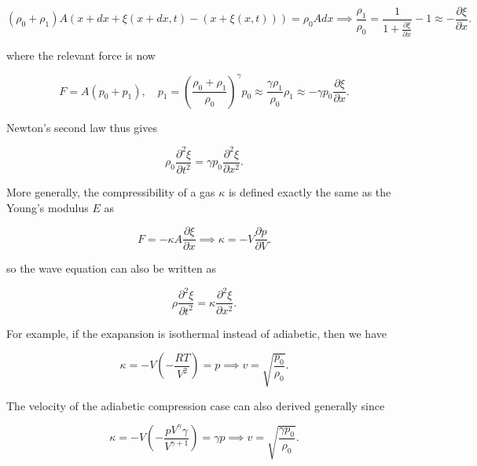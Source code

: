 \documentclass[a4paper,12pt]{report}
\begin{document}
\begin{equation}
	(\rho _{0}+\rho _{1}  ) A (x+dx+\xi (x+dx,t) - (x+\xi (x,t))) = \rho _{0}Adx \implies \frac{\rho _{1} }{\rho _{0} } = \frac{1}{1+\frac{\partial \xi }{\partial x} }-1 \approx - \frac{\partial \xi }{\partial x}.    
\end{equation}

where the relevant force is now 

\begin{equation}
	F = A(p_0 + p_1 ), \quad p_1 = \left(\frac{\rho _{0} + \rho _{1}  }{\rho _{0} }\right)^{\gamma } p_0 \approx \frac{\gamma \rho _{1} }{\rho _{0} }\rho _{1} \approx - \gamma p_0 \frac{\partial \xi }{\partial x}.
\end{equation}

Newton's second law thus gives 

\begin{equation}
	\rho _{0} \frac{\partial^2 \xi }{\partial t^2} = \gamma p_0 \frac{\partial^2 \xi }{\partial x^2}. 
\end{equation}

More generally, the compressibility of a gas \(\kappa \) is defined exactly the same as the Young's modulus \(E\) as

\begin{equation}
	F = -\kappa A \frac{\partial \xi }{\partial x} \implies \kappa = -V \frac{\partial p}{\partial V}.  
\end{equation}

so the wave equation can also be written as 

\begin{equation}
	\rho \frac{\partial^2 \xi }{\partial t^2} = \kappa \frac{\partial^2 \xi }{\partial x^2}.  
\end{equation}

For example, if the exapansion is isothermal instead of adiabetic, then we have

\begin{equation}
	\kappa = -V \left( -\frac{RT}{V^2}  \right) = p \implies v = \sqrt{\frac{p_0 }{\rho _{0} } }. 
\end{equation}

The velocity of the adiabetic compression case can also derived generally since 

\begin{equation}
	\kappa = -V \left( -\frac{pV^{\gamma }\gamma  }{V^{\gamma +1} }  \right) = \gamma p \implies v = \sqrt{\frac{\gamma p_0 }{\rho _{0} } }. 
\end{equation}
\end{document}
